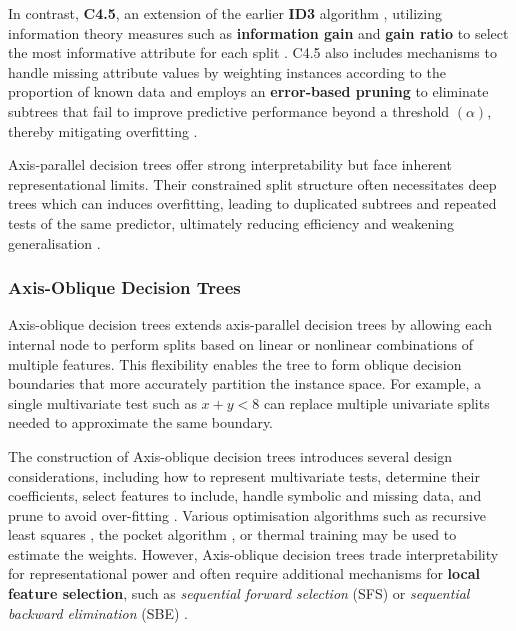 In contrast, \textbf{C4.5}, an extension of the earlier \textbf{ID3} algorithm \citep{quinlan1986}, utilizing information theory measures such as \textbf{information gain} and \textbf{gain ratio} to select the most informative attribute for each split \citep{quinlan1993}. C4.5 also includes mechanisms to handle missing attribute values by weighting instances according to the proportion of known data and employs an \textbf{error-based pruning} to eliminate subtrees that fail to improve predictive performance beyond a threshold \((\alpha)\), thereby mitigating overfitting \citep{mingers1989, schaffer1992}.

Axis‑parallel decision trees offer strong interpretability but face inherent representational limits. Their constrained split structure often necessitates deep trees which can induces overfitting, leading to duplicated subtrees and repeated tests of the same predictor, ultimately reducing efficiency and weakening generalisation \citep{pagallo1990}.

\subsubsection{Axis-Oblique Decision Trees}\label{axis-oblique-decision-trees}

Axis-oblique decision trees extends axis-parallel decision trees by allowing each internal node to perform splits based on linear or nonlinear combinations \citep{said2025} of multiple features. This flexibility enables the tree to form oblique decision boundaries that more accurately partition the instance space. For example, a single multivariate test such as \(x + y < 8\) can replace multiple univariate splits needed to approximate the same boundary.

The construction of Axis-oblique decision trees introduces several design considerations, including how to represent multivariate tests, determine their coefficients, select features to include, handle symbolic and missing data, and prune to avoid over-fitting \citep{brodley1995}. Various optimisation algorithms such as recursive least squares \citep{young1984}, the pocket algorithm \citep{gallant1986}, or thermal training \citep{frean1990} may be used to estimate the weights. However, Axis-oblique decision trees trade interpretability for representational power and often require additional mechanisms for \textbf{local feature selection}, such as \emph{sequential forward selection} (SFS) or \emph{sequential backward elimination} (SBE) \citep{kittler1986}.

